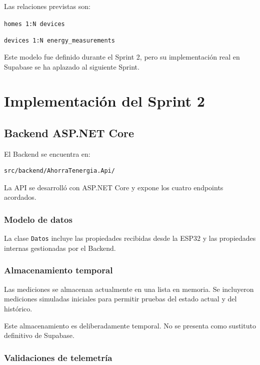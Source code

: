 \documentclass[11pt,a4paper,oneside]{report}
\begin{document}
Las relaciones previstas son:

\begin{center}
\texttt{homes 1:N devices}\par
\texttt{devices 1:N energy\_measurements}
\end{center}

Este modelo fue definido durante el Sprint 2, pero su implementación real en Supabase se ha aplazado al siguiente Sprint.


\chapter{Implementación del Sprint 2}

\section{Backend ASP.NET Core}

El Backend se encuentra en:

\begin{verbatim}
src/backend/AhorraTenergia.Api/
\end{verbatim}

La API se desarrolló con ASP.NET Core y expone los cuatro endpoints acordados.

\subsection{Modelo de datos}

La clase \texttt{Datos} incluye las propiedades recibidas desde la ESP32 y las propiedades internas gestionadas por el Backend.

\subsection{Almacenamiento temporal}

Las mediciones se almacenan actualmente en una lista en memoria. Se incluyeron mediciones simuladas iniciales para permitir pruebas del estado actual y del histórico.

Este almacenamiento es deliberadamente temporal. No se presenta como sustituto definitivo de Supabase.

\subsection{Validaciones de telemetría}
\end{document}
